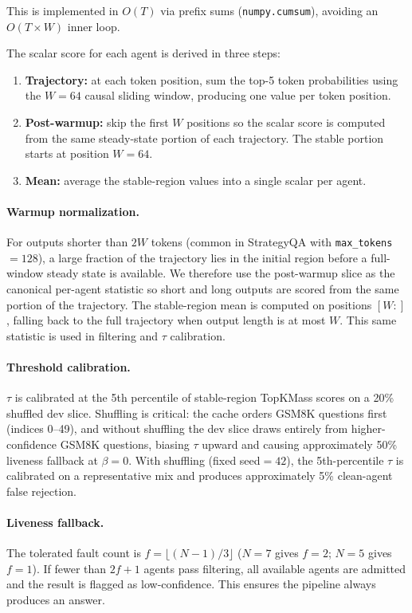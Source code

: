 \documentclass[11pt]{article}
\begin{document}
This is implemented in $O(T)$ via prefix sums (\texttt{numpy.cumsum}), avoiding
an $O(T \times W)$ inner loop.

The scalar score for each agent is derived in three steps:
\begin{enumerate}[leftmargin=*, itemsep=2pt]
  \item \textbf{Trajectory:} at each token position, sum the top-5 token
        probabilities using the $W=64$ causal sliding window, producing one
        value per token position.
  \item \textbf{Post-warmup:} skip the first $W$ positions so the scalar score
        is computed from the same steady-state portion of each trajectory. The
        stable portion starts at position $W=64$.
  \item \textbf{Mean:} average the stable-region values into a single scalar
        per agent.
\end{enumerate}

\paragraph{Warmup normalization.}
For outputs shorter than $2W$ tokens (common in StrategyQA with
\texttt{max\_tokens}$=128$), a large fraction of the trajectory lies in the
initial region before a full-window steady state is available. We therefore use
the post-warmup slice as the canonical per-agent statistic so short and long
outputs are scored from the same portion of the trajectory. The stable-region
mean is computed on positions $[W{:}]$, falling back to the full trajectory when
output length is at most $W$. This same statistic is used in filtering and
$\tau$ calibration.

\paragraph{Threshold calibration.}
$\tau$ is calibrated at the 5th percentile of stable-region TopKMass scores on
a 20\% shuffled dev slice. Shuffling is critical: the cache orders GSM8K
questions first (indices 0--49), and without shuffling the dev slice draws
entirely from higher-confidence GSM8K questions, biasing $\tau$ upward and
causing approximately 50\% liveness fallback at $\beta=0$. With shuffling (fixed
seed$=42$), the 5th-percentile $\tau$ is calibrated on a representative mix and
produces approximately 5\% clean-agent false rejection.

\paragraph{Liveness fallback.}
The tolerated fault count is $f = \lfloor(N-1)/3\rfloor$ ($N=7$ gives $f=2$;
$N=5$ gives $f=1$). If fewer than $2f+1$ agents pass filtering, all available
agents are admitted and the result is flagged as low-confidence. This ensures the
pipeline always produces an answer.
\end{document}
